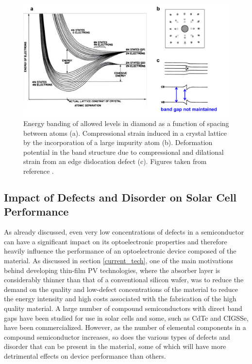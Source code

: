 \begin{figure}[h!]
  \centering
    \includegraphics[width=1.0\textwidth]{figures/pankove_band_fluc.png}
    \caption{Energy banding of allowed levels in diamond as a function of spacing between atoms (a). Compressional strain induced in a crystal lattice by the incorporation of a large impurity atom (b). Deformation potential in the band structure due to compressional and dilational strain from an edge dislocation defect (c). Figures taken from reference .}
  \label{pankove_band_fluc}
\end{figure}


\subsection{Impact of Defects and Disorder on Solar Cell Performance}\label{defects_in_PV}

As already discussed, even very low concentrations of defects in a semiconductor can have a significant impact on its optoelectronic properties and therefore heavily influence the performance of an optoelectronic device composed of the material. As discussed in section \ref{current_tech}, one of the main motivations behind developing thin-film PV technologies, where the absorber layer is considerably thinner than that of a conventional silicon wafer, was to reduce the demand on the quality and low-defect concentrations of the material to reduce the energy intensity and high costs associated with the fabrication of the high quality material. A large number of compound semiconductors with direct band gaps have been studied for use in solar cells and some, such as CdTe and CIGSSe, have been commercialized. However, as the number of elemental components in a compound semiconductor increases, so does the various types of defects and disorder that can be present in the material, some of which will have more detrimental effects on device performance than others.\\

